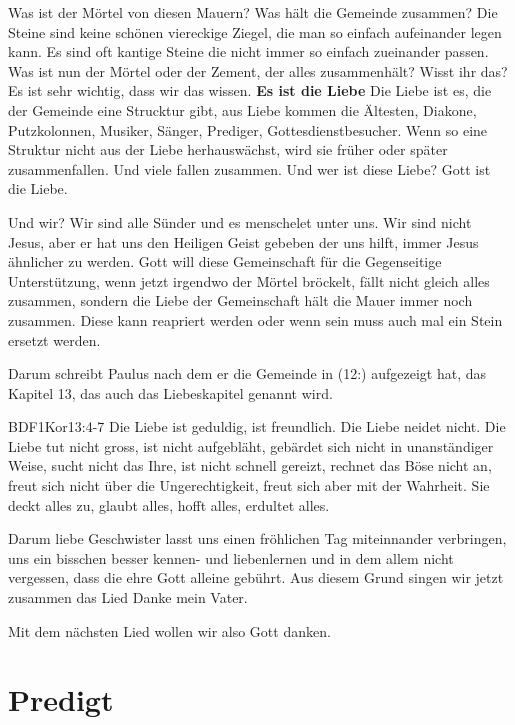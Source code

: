 \documentclass{../../inc/mybib}
\begin{document}
\begin{spacing}{1.5}
Was ist der Mörtel von diesen Mauern? Was hält die Gemeinde zusammen? Die Steine sind keine schönen viereckige Ziegel, die man so einfach aufeinander legen kann. Es sind oft kantige Steine die nicht immer so einfach zueinander passen. Was ist nun der Mörtel oder der Zement, der alles zusammenhält? Wisst ihr das? Es ist sehr wichtig, dass wir das wissen. \textbf{Es ist die Liebe} Die Liebe ist es, die der Gemeinde eine Strucktur gibt, aus Liebe kommen die Ältesten, Diakone, Putzkolonnen, Musiker, Sänger, Prediger, Gottesdienstbesucher. Wenn so eine Struktur nicht aus der Liebe herhauswächst, wird sie früher oder später zusammenfallen. Und viele fallen zusammen. Und wer ist diese Liebe? Gott ist die Liebe.

Und wir? Wir sind alle Sünder und es menschelet unter uns. Wir sind nicht Jesus, aber er hat uns den Heiligen Geist gebeben der uns hilft, immer Jesus ähnlicher zu werden. Gott will diese Gemeinschaft für die Gegenseitige Unterstützung, wenn jetzt irgendwo der Mörtel bröckelt, fällt nicht gleich alles zusammen, sondern die Liebe der Gemeinschaft hält die Mauer immer noch zusammen. Diese kann reapriert werden oder wenn sein muss auch mal ein Stein ersetzt werden.

Darum schreibt Paulus nach dem er die Gemeinde in (12:) aufgezeigt hat, das Kapitel 13, das auch das Liebeskapitel genannt wird.

\begin{bibelbox}{BDF}{1Kor}{13:4-7}
Die Liebe ist geduldig, ist freundlich. Die Liebe neidet nicht. Die Liebe tut nicht gross, ist nicht aufgebläht, gebärdet sich nicht in unanständiger Weise, sucht nicht das Ihre, ist nicht schnell gereizt, rechnet das Böse nicht an, freut sich nicht über die Ungerechtigkeit, freut sich aber mit der Wahrheit. Sie deckt alles zu, glaubt alles, hofft alles, erdultet alles.
\end{bibelbox}

Darum liebe Geschwister lasst uns einen fröhlichen Tag miteinnander verbringen, uns ein bisschen besser kennen- und liebenlernen und in dem allem nicht vergessen, dass die ehre Gott alleine gebührt. Aus diesem Grund singen wir jetzt zusammen das Lied Danke mein Vater.

Mit dem nächsten Lied wollen wir also Gott danken.
\end{spacing}

\section{Predigt}
\end{document}
